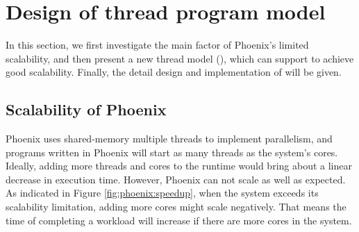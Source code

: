 \section{Design of thread program model}
\label{sec:design}
In this section, we first investigate the main factor of Phoenix's limited scalability, 
and then present a new thread model (\myth), which can support \myds to achieve good scalability.
Finally, the detail design and implementation of \myth will be given.


\subsection{Scalability of Phoenix}
Phoenix uses shared-memory multiple threads to implement parallelism, and programs written in Phoenix will start as many threads as the system's cores.
Ideally, adding more threads and cores to the runtime would bring about a linear decrease in execution time.
However, Phoenix can not scale as well as expected.
As indicated in Figure \ref{fig:phoenix:speedup}, when the system exceeds its scalability limitation, adding more cores might scale negatively.
That means the time of completing a workload will increase if there are more cores in the system. 

